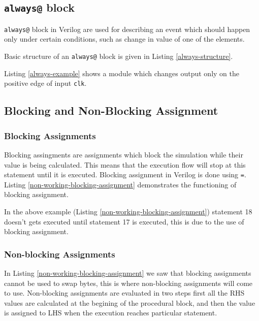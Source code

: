 \documentclass[a4paper,10pt]{article}
\theoremstyle{mytheor}
\newcommand{
  \insertverilog}[3]{
  
}
\newcommand{\inlinev}[1]{\lstinline[style=verilog-inline-style]{#1}}
\begin{document}
\insertverilog{./verilog_files/initialStructure.v}{initial-structure}{Structure
  of an initial block.}

\subsection{\inlinev{always@} block}
\inlinev{always@} block in Verilog are used for describing an event
which should happen only under certain conditions, such as change in
value of one of the elements.
 
Basic structure of an \inlinev{always@} block is given in Listing
\ref{always-structure}.

\insertverilog{./verilog_files/alwaysStructure.v}{always-structure}{Structure
  of an always@ block.}

Listing \ref{always-example} shows a module which changes output only
on the positive edge of input \inlinev{clk}.

\insertverilog{./verilog_files/alwaysExample.v}{always-example}{Synchronous
  logic which changes value of result only at the positive edge of
  clk.}
 
\subsection{Blocking and Non-Blocking Assignment}
\subsubsection{Blocking Assignments}
Blocking assingments are assignments which block the simulation while
their value is being calculated. This means that the execution flow
will stop at this statement until it is executed. Blocking assignment
in Verilog is done using
\inlinev{=}. Listing
\ref{non-working-blocking-assignment} demonstrates the functioning of
blocking assignment.

\insertverilog{./verilog_files/nonWorkingSwap.v}{non-working-blocking-assignment}{Swapping bytes using blocking assignment.}  

In the above example (Listing \ref{non-working-blocking-assignment})
statement 18 doesn't gets executed until statement 17 is executed,
this is due to the use of blocking assignment.

\subsubsection{Non-blocking Assignments} 
In Listing \ref{non-working-blocking-assignment} we saw that blocking
assignments cannot be used to swap bytes, this is where non-blocking
assignments will come to use. Non-blocking assignments are evaluated
in two steps first all the RHS values are calculated at the begining
of the procedural block, and then the value is assigned to LHS when
the execution reaches particular statement.
\end{document}
